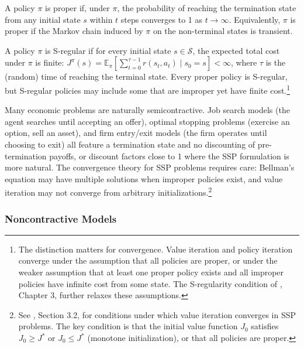 \begin{definition}
\label{def:proper_policy}
A policy $\pi$ is proper if, under $\pi$, the probability of reaching the termination state from any initial state $s$ within $t$ steps converges to 1 as $t \to \infty$. Equivalently, $\pi$ is proper if the Markov chain induced by $\pi$ on the non-terminal states is transient.
\end{definition}

\begin{definition}
\label{def:s_regular}
A policy $\pi$ is S-regular if for every initial state $s \in \mathcal{S}$, the expected total cost under $\pi$ is finite: $J^\pi(s) = \mathbb{E}_\pi\left[\sum_{t=0}^{\tau-1} r(s_t, a_t) \mid s_0 = s\right] < \infty$, where $\tau$ is the (random) time of reaching the terminal state. Every proper policy is S-regular, but S-regular policies may include some that are improper yet have finite cost.\footnote{The distinction matters for convergence. Value iteration and policy iteration converge under the assumption that all policies are proper, or under the weaker assumption that at least one proper policy exists and all improper policies have infinite cost from some state. The S-regularity condition of \citet{bertsekas2022}, Chapter 3, further relaxes these assumptions.}
\end{definition}

Many economic problems are naturally semicontractive. Job search models (the agent searches until accepting an offer), optimal stopping problems (exercise an option, sell an asset), and firm entry/exit models (the firm operates until choosing to exit) all feature a termination state and no discounting of pre-termination payoffs, or discount factors close to 1 where the SSP formulation is more natural. The convergence theory for SSP problems requires care: Bellman's equation may have multiple solutions when improper policies exist, and value iteration may not converge from arbitrary initializations.\footnote{See \citet{bertsekas2022}, Section 3.2, for conditions under which value iteration converges in SSP problems. The key condition is that the initial value function $J_0$ satisfies $J_0 \geq J^*$ or $J_0 \leq J^*$ (monotone initialization), or that all policies are proper.}

\subsubsection{Noncontractive Models}


